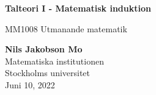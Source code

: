 \begin{titlepage}
    \begin{center}
        \vspace*{1cm}
            
        \Huge
        \textbf{Talteori I - Matematisk induktion}
            
        \vspace{0.5cm}
        \LARGE
        MM1008 Utmanande matematik

        \vfill
            
        \vspace{0.8cm}
            
        \Large
        \textbf{Nils Jakobson Mo} \\
        Matematiska institutionen\\
        Stockholms universitet\\
        Juni 10, 2022
            
    \end{center}
\end{titlepage}